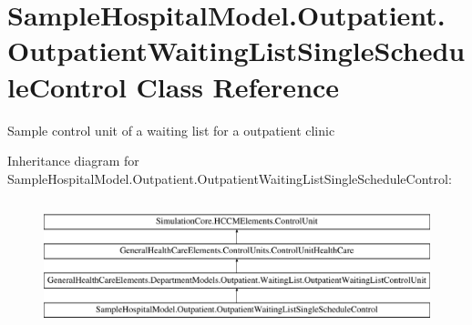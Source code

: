 \hypertarget{class_sample_hospital_model_1_1_outpatient_1_1_outpatient_waiting_list_single_schedule_control}{}\section{Sample\+Hospital\+Model.\+Outpatient.\+Outpatient\+Waiting\+List\+Single\+Schedule\+Control Class Reference}
\label{class_sample_hospital_model_1_1_outpatient_1_1_outpatient_waiting_list_single_schedule_control}


Sample control unit of a waiting list for a outpatient clinic  


Inheritance diagram for Sample\+Hospital\+Model.\+Outpatient.\+Outpatient\+Waiting\+List\+Single\+Schedule\+Control\+:\begin{figure}[H]
\begin{center}
\leavevmode
\includegraphics[height=3.758389cm]{class_sample_hospital_model_1_1_outpatient_1_1_outpatient_waiting_list_single_schedule_control}
\end{center}
\end{figure}
